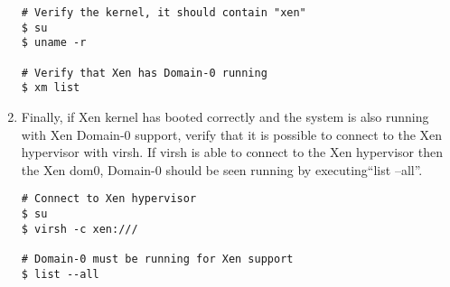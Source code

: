 \begin{enumerate}
\lstset{language=bash,caption=Verify Xen Booted Correctly}
\begin{lstlisting}
# Verify the kernel, it should contain "xen"
$ su
$ uname -r

# Verify that Xen has Domain-0 running
$ xm list
\end{lstlisting}

\item	Finally, if Xen kernel has booted correctly and the system is also running with Xen Domain-0 support, verify that it is
			possible to connect to the Xen hypervisor with virsh. If virsh is able to connect to the Xen hypervisor then the Xen dom0, 
			Domain-0 should be seen running by executing``list --all''.
			
\lstset{language=bash,caption=Verify virsh can Connect to Xen Hypervisor}
\begin{lstlisting}
# Connect to Xen hypervisor
$ su
$ virsh -c xen:///

# Domain-0 must be running for Xen support
$ list --all
\end{lstlisting}
\end{enumerate}




